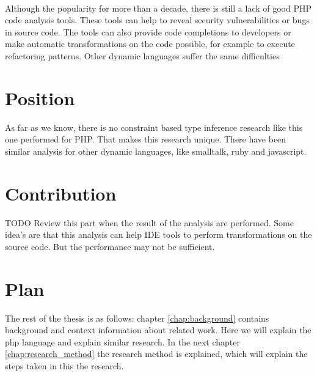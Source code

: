 \documentclass[../main.tex]{subfiles}
\begin{document}
        \paragraph{}%
        Although the popularity for more than a decade, there is still a lack of good PHP code analysis tools.
        These tools can help to reveal security vulnerabilities or bugs in source code.
        The tools can also provide code completions to developers or make automatic transformations on the code possible, for example to execute refactoring patterns.
        Other dynamic languages suffer the same difficulties
        
    \section{Position} %
        As far as we know, there is no constraint based type inference research like this one performed for PHP.
        That makes this research unique.
        There have been similar analysis for other dynamic languages, like smalltalk, ruby and javascript.
       
    \section{Contribution} %
        TODO Review this part when the result of the analysis are performed.
        Some idea's are that this analysis can help IDE tools to perform transformations on the source code.
        But the performance may not be sufficient.
        \\
        \blindtext %
    
    \section{Plan} %
        The rest of the thesis is as follows:
        chapter \ref{chap:background} contains background and context information about related work.
        Here we will explain the php language and explain similar research.
        In the next chapter \ref{chap:research_method} the research method is explained, which will explain the steps taken in this the research.
        
\end{document}
